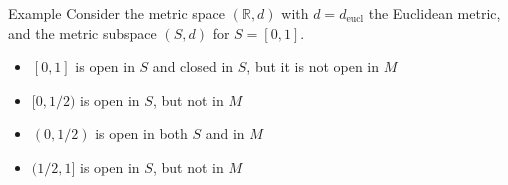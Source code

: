\documentclass{beamer}
\begin{document}
\begin{frame}{Example}
Consider the metric space $(\mathbb{R},d)$ with $d = d_{\text{eucl}}$ the Euclidean metric, and the metric subspace $(S,d)$ for $S = [0,1]$.
\begin{itemize}
\pause
\item $[0,1]$ is open in $S$ and closed in $S$, but it is not open in $M$
\pause
\item $[0,1/2)$ is open in $S$, but not in $M$
\pause
\item $(0,1/2)$ is open in both $S$ and in $M$
\pause
\item $(1/2,1]$ is open in $S$, but not in $M$
\end{itemize}
\end{frame}
\end{document}
